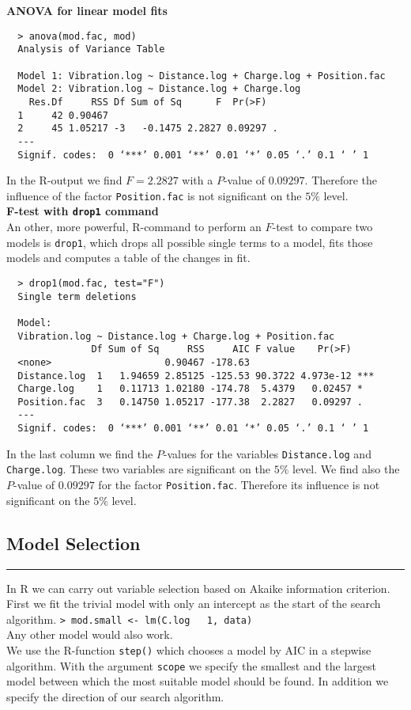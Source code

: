 \textbf{ANOVA for linear model fits}\\
\begingroup
\scriptsize
\begin{verbatim}
  > anova(mod.fac, mod)
  Analysis of Variance Table

  Model 1: Vibration.log ~ Distance.log + Charge.log + Position.fac
  Model 2: Vibration.log ~ Distance.log + Charge.log
    Res.Df     RSS Df Sum of Sq      F  Pr(>F)
  1     42 0.90467
  2     45 1.05217 -3   -0.1475 2.2827 0.09297 .
  ---
  Signif. codes:  0 ‘***’ 0.001 ‘**’ 0.01 ‘*’ 0.05 ‘.’ 0.1 ‘ ’ 1

\end{verbatim}
\endgroup
In the R-output we find $F = 2.2827$ with a $P$-value of $0.09297$. Therefore the influence of the factor \texttt{Position.fac} is not significant on the $5\%$ level.\\

\textbf{F-test with \texttt{drop1} command}\\
An other, more powerful, R-command to perform an $F$-test to compare two models is \texttt{drop1}, which drops all possible single terms to a model, fits those models and computes a table of the changes in fit.\\

\begingroup
\scriptsize
\begin{verbatim}
  > drop1(mod.fac, test="F")
  Single term deletions

  Model:
  Vibration.log ~ Distance.log + Charge.log + Position.fac
               Df Sum of Sq     RSS     AIC F value    Pr(>F)
  <none>                    0.90467 -178.63
  Distance.log  1   1.94659 2.85125 -125.53 90.3722 4.973e-12 ***
  Charge.log    1   0.11713 1.02180 -174.78  5.4379   0.02457 *
  Position.fac  3   0.14750 1.05217 -177.38  2.2827   0.09297 .
  ---
  Signif. codes:  0 ‘***’ 0.001 ‘**’ 0.01 ‘*’ 0.05 ‘.’ 0.1 ‘ ’ 1

\end{verbatim}
\endgroup
In the last column we find the $P$-values for the variables \texttt{Distance.log} and \texttt{Charge.log}. These two variables are significant on the $5\%$ level. We find also the $P$-value of $0.09297$ for the factor \texttt{Position.fac}. Therefore its influence is not significant on the $5\%$ level.\\


\subsection{Model Selection}
\noindent\rule[\linienAbstand]{\linewidth}{\linienDicke}
In R we can carry out variable selection based on Akaike information criterion. First we fit the trivial model with only an intercept as the start of the search algorithm. \texttt{> mod.small <- lm(C.log ~ 1, data)}\\
Any other model would also work.\\
We use the R-function \texttt{step()} which chooses a model by AIC in a stepwise algorithm. With the argument \texttt{scope} we specify the smallest and the largest model between which the most suitable model should be found. In addition we specify the direction of our search algorithm.\\

